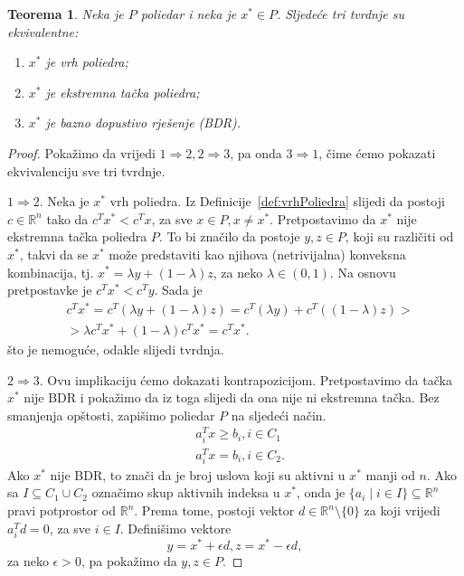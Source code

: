 \documentclass[a4paper, utf8, 11pt, colorlinks]{book}
\newtheorem{thm}{Teorema}[chapter]
\theoremstyle{definition}
\begin{document}
\begin{thm}
   Neka je $P$ poliedar i neka je $x^* \in P$. Sljedeće tri tvrdnje su ekvivalentne:
   \begin{enumerate}
       \item $x^*$ je vrh poliedra;
       \item $x^*$ je ekstremna tačka poliedra;
       \item $x^*$ je bazno dopustivo rješenje (BDR).
   \end{enumerate}
\end{thm}

\begin{proof}
      Pokažimo da vrijedi $1 \Rightarrow 2, 2 \Rightarrow 3$, pa onda $3 \Rightarrow 1$, čime ćemo pokazati ekvivalenciju sve tri tvrdnje.
      
      $1 \Rightarrow 2$. Neka je $x^*$ vrh poliedra. Iz Definicije~\ref{def:vrhPoliedra} slijedi da 
      postoji $c\in \mathbb{R}^n$ tako da $c^Tx^* < c^T x$, za sve $x \in P, x \neq x^*$. Pretpostavimo da $x^*$ nije ekstremna tačka poliedra $P$. 
      To bi značilo da postoje $y,z \in P$, koji su različiti od $x^*$, takvi da se $x^*$ može predstaviti kao njihova (netrivijalna) konveksna kombinacija, tj. $x^* = \lambda y + (1 - \lambda) z $, za neko $\lambda \in (0,1 )$. Na osnovu pretpostavke je $c^T x^* < c^T y$.  Sada je 
      \begin{align}
          &c^T x^* = c^T ( \lambda y + (1 - \lambda) z )  = c^T( \lambda y) + c^T((1- \lambda) z) > \nonumber \\
          &>\lambda c^T x^* + ( 1 - \lambda) c^T x^* = c^T x^*.
      \end{align}
      što je nemoguće, odakle slijedi tvrdnja. 
      
      $2 \Rightarrow 3$.
       Ovu implikaciju ćemo dokazati kontrapozicijom. Pretpostavimo da tačka $x^*$ nije BDR i pokažimo da iz toga slijedi da ona nije ni ekstremna tačka.
      Bez smanjenja opštosti, zapišimo poliedar $P$ na sljedeći način.
       \begin{align}
            & a_i^T x \geq b_i, i \in C_1 \\
            & a_i^T x  = b_i, i \in C_2.
       \end{align}
       Ako $x^*$ nije BDR, to znači da je broj uslova koji su aktivni u $x^*$ manji od $n$. 
       Ako sa $I \subseteq C_1 \cup C_2$ označimo skup aktivnih indeksa u $x^*$, onda 
       je $\{ a_i \mid i \in I \} \subseteq \mathbb{R}^n$ pravi potprostor od $\mathbb{R}^n$.  Prema tome, postoji vektor $d \in \mathbb{R}^n \setminus \{0\}$ za koji vrijedi $a_i^T d = 0$, za sve $i \in I$. Definišimo vektore 
       $$ y = x^* + \epsilon d, z = x^* - \epsilon d, $$
       za neko $\epsilon > 0$, pa pokažimo da $y, z \in P$.
       

\end{proof}
\end{document}
